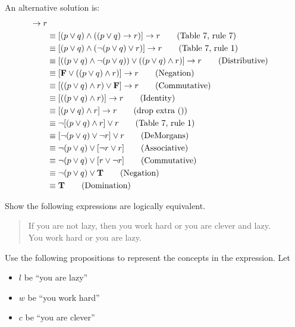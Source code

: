 \begin{questions}
\begin{solution}
\begin{enumerate}[label=(\alph*),itemsep=0pt,parsep=0pt,
topsep=0pt,partopsep=0pt]
    An alternative solution is:
    \begin{align*}
      [(p \vee q) &\wedge (p \ra r) \wedge (q \ra r)] \ra r \\
       &\equiv [(p \vee q) \wedge ((p \vee q) \ra r)] \ra r \tag{Table 7, rule 7} \\
       &\equiv [(p \vee q) \wedge (\neg (p \vee q) \vee r)] \ra r \tag{Table 7, rule 1} \\
       &\equiv [((p \vee q) \wedge \neg (p \vee q)) \vee ((p \vee q) \wedge r)] \ra r \tag{Distributive} \\
       &\equiv [\mathbf{F} \vee ((p \vee q) \wedge r)] \ra r \tag{Negation} \\
       & \equiv [((p \vee q) \wedge r) \vee \mathbf{F}] \ra r \tag{Commutative} \\
       & \equiv [((p \vee q) \wedge r)] \ra r \tag{Identity} \\
       & \equiv [(p \vee q) \wedge r] \ra r \tag{drop extra ()} \\
       & \equiv \neg [(p \vee q) \wedge r] \vee r \tag{Table 7, rule 1} \\
       & \equiv  [\neg (p \vee q) \vee \neg r] \vee r \tag{DeMorgans} \\
       & \equiv  \neg (p \vee q) \vee [\neg r \vee r ] \tag{Associative} \\
       & \equiv \neg (p \vee q) \vee [r \vee \neg r] \tag{Commutative} \\
       & \equiv \neg (p \vee q) \vee \mathbf{T} \tag{Negation} \\
       & \equiv \mathbf{T} \tag{Domination} 
    \end{align*}

  \end{enumerate}
\end{solution}



  Show the following expressions are logically equivalent. 
\begin{quote}
  If you are not lazy, then you work hard or you are clever and lazy. \\[3pt]
  You work hard or you are lazy.
\end{quote}

Use the following propositions to represent the concepts in the expression. Let 
\begin{itemize}[itemsep=0pt,parsep=0pt,topsep=0pt,partopsep=0pt]
  \item $l$ be ``you are lazy'' 
  \item $w$ be ``you work hard''
  \item $c$ be ``you are clever''
\end{itemize}


\end{questions}
